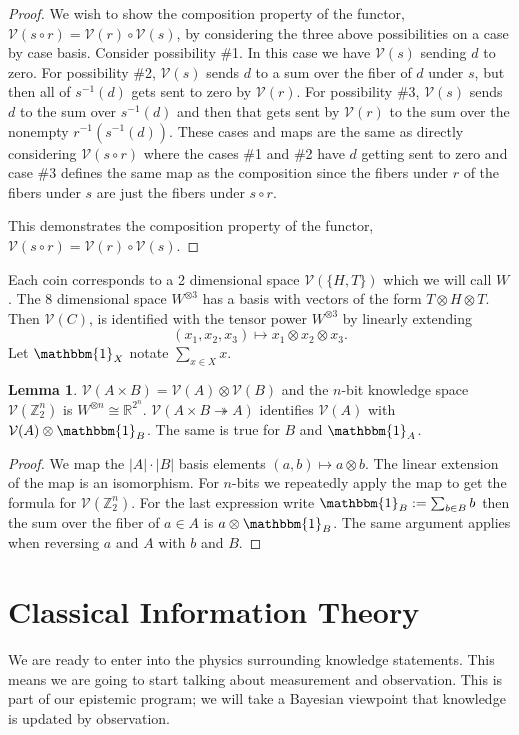 \documentclass[12pt,a4paper]{article}
\theoremstyle{myrule}
\theoremstyle{postulate}
\theoremstyle{definition}
\newtheorem{lemma}[theorem]{Lemma}
\begin{document}
\begin{proof}
  We wish to show the composition property of the functor, $\mathcal{V}(s \circ r) = \mathcal{V}(r) \circ \mathcal{V}(s)$, by considering the three above possibilities on a case by case basis.  Consider possibility \#1.  In this case we have $\mathcal{V}(s)$ sending $d$ to zero.  For possibility \#2, $\mathcal{V}(s)$ sends $d$ to a sum over the fiber of $d$ under $s$, but then all of $s^{-1}(d)$ gets sent to zero by $\mathcal{V}(r)$.  For possibility \#3, $\mathcal{V}(s)$ sends $d$ to the sum over $s^{-1}(d)$ and then that gets sent by $\mathcal{V}(r)$ to the sum over the nonempty $r^{-1}(s^{-1}(d))$.  These cases and maps are the same as directly considering $\mathcal{V}(s \circ r)$ where the cases \#1 and \#2 have $d$ getting sent to zero and case \#3 defines the same map as the composition since the fibers under $r$ of the fibers under $s$ are just the fibers under $s \circ r$.

  This demonstrates the composition property of the functor, $\mathcal{V}(s \circ r) = \mathcal{V}(r) \circ \mathcal{V}(s)$.
\end{proof}

Each coin corresponds to a 2 dimensional space $\mathcal{V}(\{H,T\})$ which we will call $W$.  The 8 dimensional space $W ^ {\otimes 3}$ has a basis with vectors of the form $T \otimes H \otimes T$.  Then $\mathcal{V}(C)$, is identified with the tensor power $W^{\otimes 3}$ by linearly extending
\[
(x_1,x_2,x_3) \mapsto x_1 \otimes x_2 \otimes x_3.
\]
Let $\mathbbm{1}_X$ notate $\sum_{x \in X} x$.
\begin{lemma}
\label{product}
  $\mathcal{V}(A \times B) = \mathcal{V}(A) \otimes \mathcal{V}(B)$ and the $n$-bit knowledge space $\mathcal{V}(\mathbb{Z}_2^n)$ is $W ^ {\otimes n} \cong \mathbb{R}^{2^n}$.  $\mathcal{V}(A \times B \twoheadrightarrow A)$ identifies $\mathcal{V}(A)$ with $\mathcal{V}(A) \otimes \mathbbm{1}_B$.  The same is true for $B$ and $\mathbbm{1}_A$.
\end{lemma}
\begin{proof}
  We map the $|A|\cdot|B|$ basis elements $(a,b) \mapsto a \otimes b$.  The linear extension of the map is an isomorphism.  For $n$-bits we repeatedly apply the map to get the formula for $\mathcal{V}(\mathbb{Z}_2^n)$.  For the last expression write $\mathbbm{1}_B := \sum_{b \in B} b$ then the sum over the fiber of $a \in A$ is $a \otimes \mathbbm{1}_B$.  The same argument applies when reversing $a$ and $A$ with $b$ and $B$.
\end{proof}

\section{Classical Information Theory}
\label{physicsstart}
We are ready to enter into the physics surrounding knowledge statements.  This means we are going to start talking about measurement and observation.  This is part of our epistemic program;  we will take a Bayesian viewpoint that knowledge is updated by observation.
\end{document}
